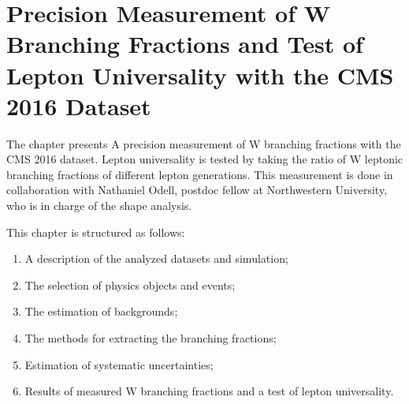 \chapter{Precision Measurement of W Branching Fractions and Test of Lepton Universality with the CMS 2016 Dataset}
\label{sec:analysis}


The chapter presents A precision measurement of W branching fractions with the CMS 2016 dataset. Lepton universality is tested by taking the ratio of W leptonic branching fractions of different lepton generations. This measurement is done in collaboration with Nathaniel Odell, postdoc fellow at Northwestern University, who is in charge of the shape analysis. 





This chapter is structured as follows:

\begin{enumerate}
    \item A description of the analyzed datasets and simulation;
    \item The selection of physics objects and events;
    \item The estimation of backgrounds;
    \item The methods for extracting the branching fractions;
    \item Estimation of systematic uncertainties;
    \item Results of measured W branching fractions and a test of lepton universality.
\end{enumerate}
    
    











